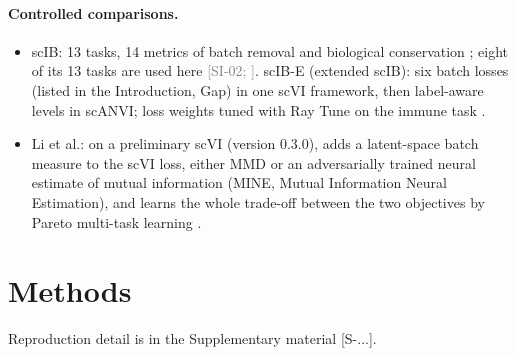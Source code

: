 \documentclass[11pt]{article}
\newcommand{\src}[1]{{\scriptsize\textcolor{gray}{[#1]}}}
\begin{document}
\paragraph{Controlled comparisons.}
\begin{itemize}
\item scIB: 13 tasks, 14 metrics of batch removal and biological conservation \citep{luecken2022benchmarking}; eight of its 13 tasks are used here \src{SI-02; }. scIB-E (extended scIB): six batch losses (listed in the Introduction, Gap) in one scVI framework, then label-aware levels in scANVI; loss weights tuned with Ray Tune on the immune task \citep{yi2025benchmarking}.
\item Li et al.: on a preliminary scVI (version 0.3.0), adds a latent-space batch measure to the scVI loss, either MMD or an adversarially trained neural estimate of mutual information (MINE, Mutual Information Neural Estimation), and learns the whole trade-off between the two objectives by Pareto multi-task learning \citep{li2022trade}.
\end{itemize}

\section{Methods}
Reproduction detail is in the Supplementary material [S-...].
\end{document}
